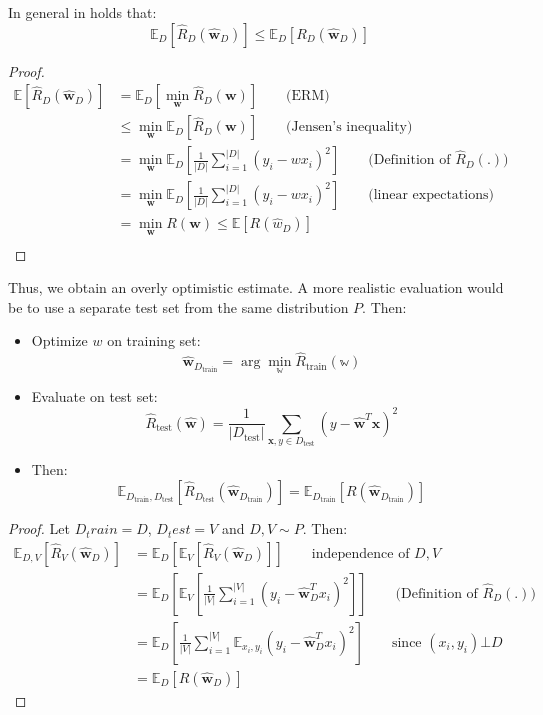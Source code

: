 \documentclass[a4paper,10pt,twoside]{article}
\begin{document}
In general in holds that:
\begin{equation*}
    \mathbb{E}_D[\hat{R}_D(\hat{\mathbf{w}}_D)]\leq\mathbb{E}_D[R_D(\hat{\mathbf{w}}_D)]
\end{equation*}
\begin{proof}[Proof]
    \begin{align*}
        \mathbb{E}[\hat{R}_D(\hat{\mathbf{w}}_D)] &= \mathbb{E}_D[\min_{\mathbf{w}}\hat{R}_D(\mathbf{w})]\qquad\text{(ERM)}\\
        &\leq \min_{\mathbf{w}}\mathbb{E}_D[\hat{R}_D(\mathbf{w})]\qquad\text{(Jensen's inequality)}\\
        &= \min_{\mathbf{w}}\mathbb{E}_D[\frac{1}{|D|}\sum_{i=1}^{|D|}(y_i-wx_i)^2]\qquad\text{(Definition of $\hat{R}_D(.)$)}\\
        &= \min_{\mathbf{w}}\mathbb{E}_D[\frac{1}{|D|}\sum_{i=1}^{|D|}(y_i-wx_i)^2]\qquad\text{(linear expectations)}\\
        &= \min_{\mathbf{w}}R(\mathbf{w})\leq\mathbb{E}[R(\hat{w}_D)]\\
    \end{align*}
\end{proof}
Thus, we obtain an overly optimistic estimate. A more realistic evaluation would be to use a separate test set from the same distribution $P$. Then:
\begin{itemize}
    \item Optimize $w$ on training set:
    \begin{equation*}
        \mathbf{\hat{w}}_{D_{\text{train}}} = \arg\min_{\mathbb{w}} \hat{R}_{\text{train}}(\mathbb{w})
    \end{equation*}
    \item Evaluate on test set:
    \begin{equation*}
        \hat{R}_{\text{test}}(\mathbf{\hat{w}})=\frac{1}{|D_{\text{test}}|}\sum_{\mathbf{x},y\in D_{\text{test}}}^{}(y-\hat{\mathbf{w}}^T\mathbf{x})^2
    \end{equation*}
    \item Then:
    \begin{equation*}
        \mathbb{E}_{D_{\text{train}}, D_{\text{test}}}[\hat{R}_{D_{\text{test}}}(\hat{\mathbf{w}}_{D_{\text{train}}})]=\mathbb{E}_{D_{\text{train}}}[R(\mathbf{\hat{w}}_{D_{\text{train}}})]
    \end{equation*}
\end{itemize}
\begin{proof}[Proof]
    Let $D_train=D$, $D_test=V$ and $D,V\sim P$. Then:
    \begin{align*}
        \mathbb{E}_{D,V}[\hat{R}_V(\hat{\mathbf{w}}_D)] &= \mathbb{E}_D[\mathbb{E}_V[\hat{R}_V(\hat{\mathbf{w}}_D)]]\qquad\text{independence of $D,V$}\\
        &=\mathbb{E}_D[\mathbb{E}_V[\frac{1}{|V|}\sum_{i=1}^{|V|}(y_i-\hat{\mathbf{w}}_D^Tx_i)^2]]\qquad\text{(Definition of $\hat{R}_D(.)$)}\\
        &=\mathbb{E}_D[\frac{1}{|V|}\sum_{i=1}^{|V|}\mathbb{E}_{x_i, y_i}(y_i-\hat{\mathbf{w}}_D^Tx_i)^2]\qquad\text{since $(x_i,y_i)\bot D$}\\
        &=\mathbb{E}_D[R(\mathbf{\hat{w}}_D)]
    \end{align*}
\end{proof}
\end{document}

